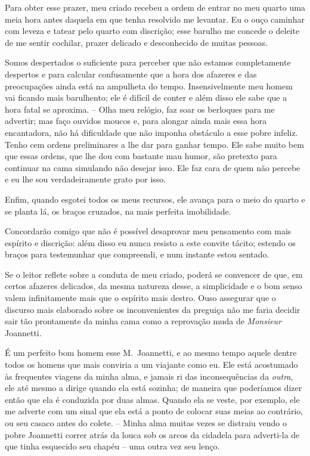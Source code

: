 Para obter esse prazer, meu criado recebeu a ordem de entrar no meu
quarto uma meia hora antes daquela em que tenha resolvido me levantar.
Eu o ouço caminhar com leveza e tatear pelo quarto com discrição; esse
barulho me concede o deleite de me sentir cochilar, prazer delicado e
desconhecido de muitas pessoas.

Somos despertados o suficiente para perceber que não estamos
completamente despertos e para calcular confusamente que a hora dos
afazeres e das preocupações ainda está na ampulheta do tempo.
Insensivelmente meu homem vai ficando mais barulhento; ele é difícil de
conter e além disso ele sabe que a hora fatal se aproxima. -- Olha meu
relógio, faz soar os berloques para me advertir; mas faço ouvidos
moucos e, para alongar ainda mais essa hora encantadora, não há
dificuldade que não imponha obstáculo a esse pobre
infeliz. Tenho cem ordens preliminares a lhe dar para ganhar tempo. Ele
sabe muito bem que essas ordens, que lhe dou com bastante mau humor,
são pretexto para continuar na cama simulando não desejar isso.
Ele faz cara de quem não percebe e eu lhe sou verdadeiramente grato por
isso.

Enfim, quando esgotei todos os meus recursos, ele avança para o meio do
quarto e se planta lá, os braços cruzados, na mais perfeita
imobilidade.

Concordarão comigo que não é possível desaprovar meu pensamento com mais
espírito e discrição: além disso eu nunca resisto a este convite
tácito; estendo os braços para testemunhar que compreendi, e num
instante estou sentado.

Se o leitor reflete sobre a conduta de meu criado, poderá se convencer
de que, em certos afazeres delicados, da mesma natureza desse, a
simplicidade e o bom senso valem infinitamente mais que o espírito mais
destro. Ouso assegurar que o discurso mais elaborado sobre os
inconvenientes da preguiça não me faria decidir sair tão prontamente da
minha cama como a reprovação muda de \textit{Monsieur} Joannetti.

É um perfeito bom homem esse M.~Joannetti, e ao mesmo tempo aquele
dentre todos os homens que mais conviria a um viajante como eu. Ele
está acostumado às frequentes viagens da minha alma, e jamais ri das
inconsequências da \textit{outra}, ele até mesmo a dirige quando ela
está sozinha; de maneira que poderíamos dizer então que ela é conduzida
por duas almas. Quando ela se veste, por exemplo, ele me adverte com um
sinal que ela está a ponto de colocar suas meias ao contrário, ou seu
casaco antes do colete. -- Minha alma muitas vezes se distraiu vendo o
pobre Joannetti correr atrás da louca sob os arcos da cidadela para
adverti-la de que tinha esquecido seu chapéu -- uma outra vez seu
lenço.

